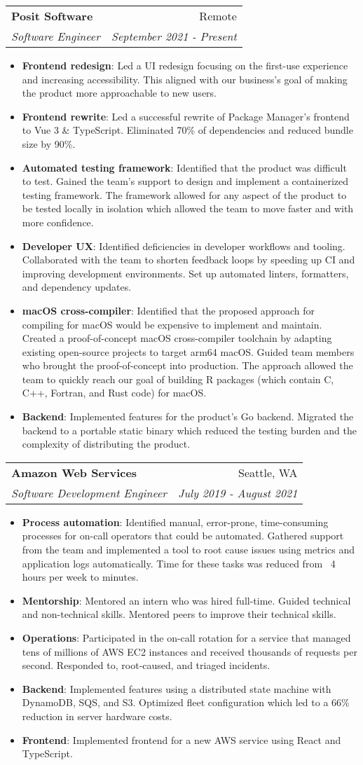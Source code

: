 \documentclass[letterpaper,11pt]{article}
\makeatletter
\newcommand{\resumeItem}[2]{
  \item\small{
    \textbf{#1}{: #2 \vspace{-2pt}}
  }
}
\newcommand{\resumeSubheading}[4]{
  \vspace{-1pt}\item
    \begin{tabular*}{0.97\textwidth}[t]{l@{\extracolsep{\fill}}r}
      \textbf{#1} & #2 \\
      \textit{\small#3} & \textit{\small #4} \\
    \end{tabular*}\vspace{-5pt}
}
\newcommand{\resumeItemListStart}{\begin{itemize}}
\newcommand{\resumeItemListEnd}{\end{itemize}\vspace{-5pt}}
\makeatother
\begin{document}
    \resumeSubheading
      {Posit Software}{Remote}
      {Software Engineer}{September 2021 - Present}
      \resumeItemListStart
        \resumeItem{Frontend redesign}{Led a UI redesign focusing on the first-use experience and increasing accessibility. This aligned with our business's goal of making the product more approachable to new users.}
        \resumeItem{Frontend rewrite}{Led a successful rewrite of Package Manager's frontend to Vue 3 \& TypeScript. Eliminated 70\% of dependencies and reduced bundle size by 90\%.}
        \resumeItem{Automated testing framework}{Identified that the product was difficult to test. Gained the team's support to design and implement a containerized testing framework. The framework allowed for any aspect of the product to be tested locally in isolation which allowed the team to move faster and with more confidence.}
        \resumeItem{Developer UX}{Identified deficiencies in developer workflows and tooling. Collaborated with the team to shorten feedback loops by speeding up CI and improving development environments. Set up automated linters, formatters, and dependency updates.}
        \resumeItem{macOS cross-compiler}{Identified that the proposed approach for compiling for macOS would be expensive to implement and maintain. Created a proof-of-concept macOS cross-compiler toolchain by adapting existing open-source projects to target arm64 macOS. Guided team members who brought the proof-of-concept into production. The approach allowed the team to quickly reach our goal of building R packages (which contain C, C++, Fortran, and Rust code) for macOS.}
        \resumeItem{Backend}{Implemented features for the product's Go backend. Migrated the backend to a portable static binary which reduced the testing burden and the complexity of distributing the product.}
      \resumeItemListEnd

    \resumeSubheading
      {Amazon Web Services}{Seattle, WA}
      {Software Development Engineer}{July 2019 - August 2021}
      \resumeItemListStart
        \resumeItem{Process automation}{Identified manual, error-prone, time-consuming processes for on-call operators that could be automated. Gathered support from the team and implemented a tool to root cause issues using metrics and application logs automatically. Time for these tasks was reduced from ~4 hours per week to minutes.}
        \resumeItem{Mentorship}{Mentored an intern who was hired full-time. Guided technical and non-technical skills. Mentored peers to improve their technical skills.}
        \resumeItem{Operations}{Participated in the on-call rotation for a service that managed tens of millions of AWS EC2 instances and received thousands of requests per second. Responded to, root-caused, and triaged incidents.}
        \resumeItem{Backend}{Implemented features using a distributed state machine with DynamoDB, SQS, and S3. Optimized fleet configuration which led to a 66\% reduction in server hardware costs.}
        \resumeItem{Frontend}{Implemented frontend for a new AWS service using React and TypeScript.}
        \resumeItemListEnd
\end{document}
